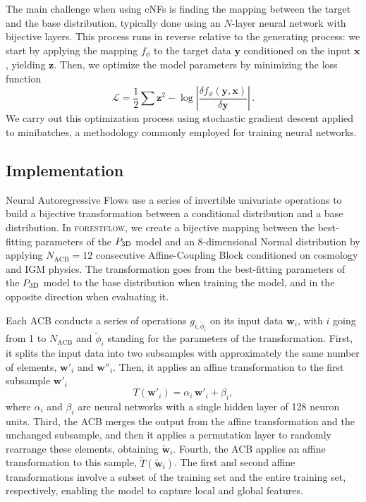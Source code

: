 \documentclass{aa}
\newcommand{\pthreed}{\ensuremath{P_{\rm 3D}}\xspace}
\newcommand{\forestflow}{\textsc{forestflow}\xspace}
\begin{document}
The main challenge when using cNFs is finding the mapping between the target and the base distribution, typically done using an $N$-layer neural network with bijective layers. This process runs in reverse relative to the generating process: we start by applying the mapping $f_\phi$ to the target data $\mathbf{y}$ conditioned on the input $\mathbf{x}$, yielding $\mathbf{z}$. Then, we optimize the model parameters by minimizing the loss function
%
\begin{equation}
    \mathcal{L} = \frac{1}{2} \sum \textbf{z}^2 - \log \left|\frac{\delta f_\phi(\mathbf{y}, \mathbf{x})}{\delta \mathbf{y}}\right|\,.
    \label{eq:loss} 
\end{equation}
%
We carry out this optimization process using stochastic gradient descent applied to minibatches, a methodology commonly employed for training neural networks.



\subsection{Implementation}
\label{sec:forestflow_implementation}

Neural Autoregressive Flows \citep{NAF} use a series of invertible univariate operations to build a bijective transformation between a conditional distribution and a base distribution. In \forestflow, we create a bijective mapping between the best-fitting parameters of the \pthreed model and an 8-dimensional Normal distribution by applying $N_\mathrm{ACB}=12$ consecutive Affine-Coupling Block \citep[ACB;][]{RealNVP} conditioned on cosmology and IGM physics. The transformation goes from the best-fitting parameters of the \pthreed model to the base distribution when training the model, and in the opposite direction when evaluating it.

Each ACB conducts a series of operations $g_{i,\tilde{\phi}_i}$ on its input data $\mathbf{w}_i$, with $i$ going from 1 to $N_\mathrm{ACB}$ and $\tilde{\phi}_i$ standing for the parameters of the transformation. First, it splits the input data into two subsamples with approximately the same number of elements, $\mathbf{w'}_i$ and $\mathbf{w''}_i$. Then, it applies an affine transformation to the first subsample $\mathbf{w'}_i$
%
\begin{equation}
    T(\mathbf{w'}_i)=\alpha_i\, \mathbf{w'}_i + \beta_i,
\end{equation}
%
where $\alpha_i$ and $\beta_i$ are neural networks with a single hidden layer of 128 neuron units. Third, the ACB merges the output from the affine transformation and the unchanged subsample, and then it applies a permutation layer to randomly rearrange these elements, obtaining $\mathbf{\tilde{w}}_i$. Fourth, the ACB applies an affine transformation to this sample, $\tilde{T}(\mathbf{\tilde{w}}_i)$. The first and second affine transformations involve a subset of the training set and the entire training set, respectively, enabling the model to capture local and global features.
\end{document}
